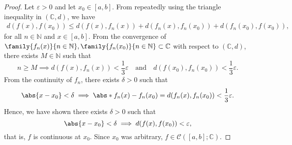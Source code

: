 \begin{proof}
    Let \(\varepsilon > 0\) and let \(x_0 \in [a,b]\). From repeatedly using the triangle inequality in \((\mathbb{C}, d)\), we have
    \begin{align*}
        d(f(x), f(x_0)) \leq d(f(x), f_n(x)) + d(f_n(x), f_n(x_0)) + d(f_n(x_0), f(x_0)),
    \end{align*}
    for all \(n \in \mathbb{N}\) and \(x \in [a,b]\). From the convergence of \(\family{f_n(x)}{n\in \mathbb{N}}, \family{f_n(x_0)}{n\in \mathbb{N}} \subset \mathbb{C}\) with respect to \((\mathbb{C}, d)\), there exists \(M \in \mathbb{N}\) such that
    \begin{equation*}
        n \geq M \implies d(f(x), f_n(x)) < \frac13 \varepsilon \quad\text{and}\quad d(f(x_0), f_n(x_0)) < \frac13 \varepsilon.
    \end{equation*}
    From the continuity of \(f_n\), there exists \(\delta > 0\) such that
    \begin{equation*}
        \abs{x - x_0} < \delta \implies \abs*{f_n(x) - f_n(x_0)} = d(f_n(x), f_n(x_0)) < \frac13\varepsilon.
    \end{equation*}
    Hence, we have shown there exists \(\delta > 0\) such that
    \begin{equation*}
        \abs{x - x_0} < \delta \implies d(f(x), f(x_0)) < \varepsilon,
    \end{equation*}
    that is, \(f\) is continuous at \(x_0\). Since \(x_0\) was arbitrary, \(f \in \mathcal{C}([a,b]; \mathbb{C})\).


\end{proof}
